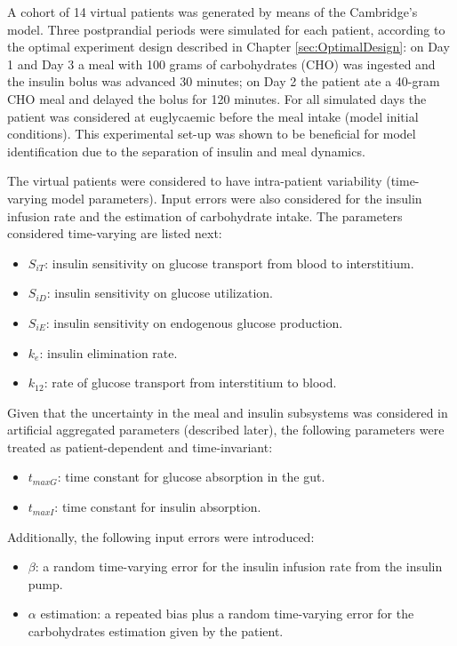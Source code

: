 A cohort of 14 virtual patients was generated by means of the Cambridge's model. Three postprandial periods were simulated for each patient, according to the optimal experiment design described in Chapter \ref{sec:OptimalDesign}: on Day 1 and Day 3 a meal with 100 grams of carbohydrates (CHO) was ingested and the insulin bolus was advanced 30 minutes; on Day 2 the patient ate a 40-gram CHO meal and delayed the bolus for 120 minutes. For all simulated days the patient was considered at euglycaemic before the meal intake (model initial conditions). This experimental set-up was shown to be beneficial for model identification due to the separation of insulin and meal dynamics.

The virtual patients were considered to have intra-patient variability (time-varying model parameters). Input errors were also considered for the insulin infusion rate and the estimation of carbohydrate intake. The parameters considered time-varying are listed next:
\begin{itemize}
	\item $S_{iT}$: insulin sensitivity on glucose transport from blood to interstitium.
	\item $S_{iD}$: insulin sensitivity on glucose utilization.
	\item $S_{iE}$: insulin sensitivity on endogenous glucose production.
	\item $k_e$: insulin elimination rate.
	\item $k_{12}$: rate of glucose transport from interstitium to blood.
\end{itemize}
Given that the uncertainty in the meal and insulin subsystems was considered in artificial aggregated parameters (described later), the following parameters were treated as patient-dependent and time-invariant:
\begin{itemize}
	\item $t_{maxG}$: time constant for glucose absorption in the gut.
	\item $t_{maxI}$: time constant for insulin absorption.
\end{itemize}
Additionally, the following input errors were introduced:
\begin{itemize}
	\item $\beta$: a random time-varying error for the insulin infusion rate from the insulin pump.
	\item $\alpha$ estimation: a repeated bias plus a random time-varying error for the carbohydrates estimation given by the patient. 
\end{itemize}

